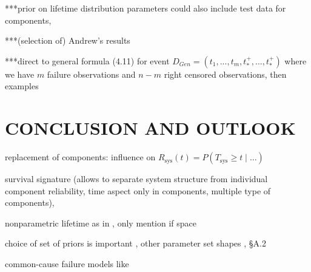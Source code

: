 \documentclass[12pt,a4paper,twocolumn,fleqn]{narms}
\newcommand{\comments}[1]{{\small\color{gray} #1}}
\begin{document}
***prior on lifetime distribution parameters could also include test data for components,

***(selection of) Andrew's results

***direct to general formula (4.11) for
event $D_{Gen}=(t_1,...,t_m,t_*^+,...,t_*^+)$ where we have $m$ failure observations and $n-m$ right censored observations,
then examples



\section{CONCLUSION AND OUTLOOK}

replacement of components: influence on $R_\text{sys}(t) = P(T_\text{sys} \geq t \mid \ldots)$ 

survival signature \cite{2012:survsign} (allows to separate system structure from individual component reliability,
time aspect only in components, multiple type of components),

nonparametric lifetime as in , \comments{only mention if space}

choice of set of priors is important \cite{1991:pericchi},
other parameter set shapes \cite{Walter2011a}, \cite{diss} \S A.2

common-cause failure models like \cite{Troffaes2014a,2015:coolen-commoncause}



\end{document}
